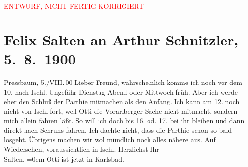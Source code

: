 
\begin{center}
            \textcolor{red}{ENTWURF, NICHT FERTIG KORRIGIERT}
                      \end{center}
            
         
         \renewcommand{\erwaehntePersonen}{Personen: Ottilie Salten}
         \renewcommand{\erwaehnteOrte}{Orte: Bad Ischl, Karlsbad, Pressbaum, Schruns, Vorarlberg}
         \renewcommand{\erwaehnteWerke}{}
               \section[Felix Salten an Arthur Schnitzler, 5. 8. 1900]{ Felix Salten an Arthur Schnitzler, 5. 8. 1900}\nopagebreak{}\rehead{ }\begin{ledgroupsized}[t]{13cm}\normalsize\beginnumbering \toendnotes[C]{\smallbreak\pagebreak[2]} 
\pstart
           \raggedleft{}{\pb}Pressbaum, 5./VIII. 00\pend
           \pstart
           Lieber Freund, wahrscheinlich komme ich noch vor dem
                  10. nach Ischl. Ungefähr
                  Dienstag Abend oder Mittwoch früh. Aber ich werde eher
               den Schluß der Parthie mitmachen als den Anfang. Ich kann am 12. noch
               nicht von Ischl fort, weil Otti die Vorarlberger
               Sache nicht mitmacht, sondern mich allein fahren läßt. So will ich doch bis
                  16. od. 17. bei ihr bleiben und dann direkt nach {\pb}Schruns fahren. Ich dachte nicht, dass die
               Parthie schon so bald losgeht. Übrigens machen wir wol mündlich noch alles nähere
               aus. \pend
           \pstart
           Auf Wiedersehen, voraussichtlich in Ischl. \pend
           \pstart
           Herzlichst Ihr {\\[\baselineskip]}\spacefill\mbox{Salten.}\pend
           \leftskip=0em{}\pstart
           \noindent{}Otti ist jetzt in Karlsbad. \pend
           
         
         \endnumbering{}\end{ledgroupsized}\begin{anhang}\end{anhang}\newcommand{\dateiname}{L03307}\newcommand{\titel}{Felix Salten an Arthur Schnitzler, 5. 8. 1900}\newcommand{\editorInnen}{Martin Anton Müller und Laura Untner}
      